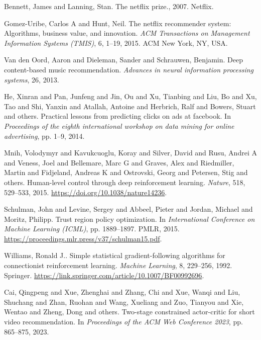 \begin{thebibliography}{99}
 Bennett, James and Lanning, Stan. {T}he netflix prize., 2007. Netflix.

 Gomez-Uribe, Carlos A and Hunt, Neil. {T}he netflix recommender system: {A}lgorithms, business value, and innovation. \textit{ACM Transactions on Management Information Systems (TMIS)}, 6, 1--19, 2015. ACM New York, NY, USA.

 Van den Oord, Aaron and Dieleman, Sander and Schrauwen, Benjamin. {D}eep content-based music recommendation. \textit{Advances in neural information processing systems}, 26, 2013.

 He, Xinran and Pan, Junfeng and Jin, Ou and Xu, Tianbing and Liu, Bo and Xu, Tao and Shi, Yanxin and Atallah, Antoine and Herbrich, Ralf and Bowers, Stuart and others. {P}ractical lessons from predicting clicks on ads at facebook. In \textit{Proceedings of the eighth international workshop on data mining for online advertising}, pp. 1--9, 2014.

 Mnih, Volodymyr and Kavukcuoglu, Koray and Silver, David and Rusu, Andrei A and Veness, Joel and Bellemare, Marc G and Graves, Alex and Riedmiller, Martin and Fidjeland, Andreas K and Ostrovski, Georg and Petersen, Stig and others. {H}uman-level control through deep reinforcement learning. \textit{Nature}, 518, 529--533, 2015. \url{https://doi.org/10.1038/nature14236}.

 Schulman, John and Levine, Sergey and Abbeel, Pieter and Jordan, Michael and Moritz, Philipp. {T}rust region policy optimization. In \textit{International Conference on Machine Learning (ICML)}, pp. 1889--1897. PMLR, 2015. \url{https://proceedings.mlr.press/v37/schulman15.pdf}.

 Williams, Ronald J.. {S}imple statistical gradient-following algorithms for connectionist reinforcement learning. \textit{Machine Learning}, 8, 229--256, 1992. Springer. \url{https://link.springer.com/article/10.1007/BF00992696}.

 Cai, Qingpeng and Xue, Zhenghai and Zhang, Chi and Xue, Wanqi and Liu, Shuchang and Zhan, Ruohan and Wang, Xueliang and Zuo, Tianyou and Xie, Wentao and Zheng, Dong and others. {T}wo-stage constrained actor-critic for short video recommendation. In \textit{Proceedings of the ACM Web Conference 2023}, pp. 865--875, 2023.
\end{thebibliography}